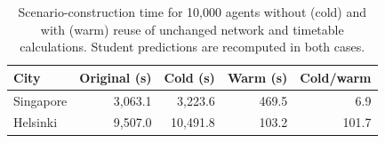 \begin{table}[pos=htbp]
\centering\small
\caption{Scenario-construction time for 10,000 agents without (cold) and with (warm) reuse of unchanged network and timetable calculations. Student predictions are recomputed in both cases.}
\label{tab:pipeline}
\begin{tabular}{@{}lrrrr@{}}
\toprule
City & Original (s) & Cold (s) & Warm (s) & Cold/warm \\
\midrule
Singapore & 3,063.1 & 3,223.6 & 469.5 & 6.9 \\
Helsinki & 9,507.0 & 10,491.8 & 103.2 & 101.7 \\
\bottomrule
\end{tabular}
\end{table}
